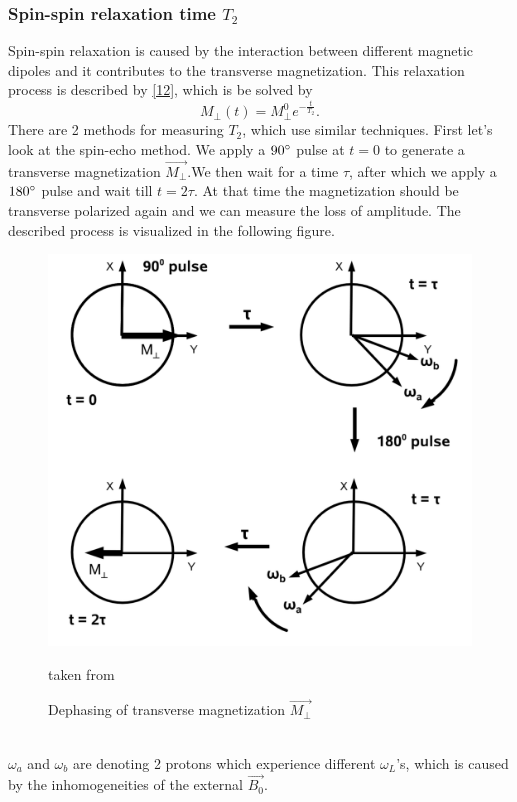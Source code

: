 \subsubsection{Spin-spin relaxation time $T_{2}$}
Spin-spin relaxation is caused by the interaction between different magnetic dipoles and it contributes to the transverse magnetization. This relaxation process is described by \eqref{12}, which is be solved by 
\begin{equation}
	\label{15}
	M_{\perp}(t) = M_{\perp}^{0}e^{-\frac{t}{T_{2}}}.
\end{equation}
There are 2 methods for measuring $T_2$, which use similar techniques. First let's look at the spin-echo method. We apply a $90\degree$ pulse at $t = 0$ to generate a transverse magnetization $\vec{M_{\perp}}$.We then wait for a time $\tau$, after which we apply a $180\degree$ pulse and wait till $t=2\tau$. At that time the magnetization should be transverse polarized again and we can measure the loss of amplitude. The described process is visualized in the following figure.
\begin{figure}[h!]
	\centering
	\includegraphics[scale=0.53]{images/spin_echo.png}
	\caption{Dephasing of transverse magnetization $\vec{M_{\perp}}$} taken from \cite{manual}
	\label{spin-spin}
\end{figure} \\
$\omega_a$ and $\omega_b$ are denoting 2 protons which experience different $\omega_L$'s, which is caused by the inhomogeneities of the external $\vec{B_0}$.\\
